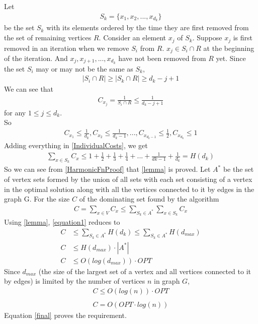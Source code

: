 \documentclass[paper=a4, fontsize=11pt]{scrartcl} %
\numberwithin{figure}{section} %
\numberwithin{table}{section} %
\begin{document}
\begin{enumerate}
Let 
\begin{align*} 
S_k = \{x_1, x_2, ..., x_{d_k}\} 
\end{align*}
be the set $S_k$ with its elements ordered by the time they are first removed from the set of remaining vertices $R$. Consider an element $x_j$ of $S_k$. Suppose  $x_j$ is first removed in an iteration when we remove $S_i$ from $R$. $x_j \in S_i \cap R$ at the beginning of the iteration. And $x_j, x_{j+1}, ..., x_{d_k}$ have not been removed from $R$ yet. Since the set $S_i$ may or may not be the same as $S_k$, 
\begin{align*} 
\left | S_i \cap R \right | \geq \left | S_k \cap R \right | \geq d_k - j + 1
\end{align*}
We can see that
\begin{align*} 
C_{x_j} = \frac{1}{S_i \cap R} \leq \frac{1}{d_k - j + 1} 
\end{align*} for any $1 \leq j \leq d_k$.\\
So
\begin{align} \label{IndividualCosts}
C_{x_1} \leq \frac{1}{d_k}, C_{x_2} \leq \frac{1}{d_k -1},..., C_{x_{d_k -1}} \leq \frac{1}{2}, C_{x_{d_k}} \leq 1
\end{align}
Adding everything in \ref{IndividualCosts}, we get
\begin{align} \label{HarmonicFnProof}
\sum \limits_{x \in S_k} C_x \leq 1 + \frac{1}{2} + \frac{1}{3}+ \frac{1}{4} + ... + \frac{1}{d{k-1}} + \frac{1}{d_k} = H(d_k)
\end{align}
So we can see from \ref{HarmonicFnProof} that \ref{lemma} is proved. Let $A^*$ be the set of vertex sets formed by the union of all sets with each set consisting of a vertex in the optimal solution along with all the vertices connected to it by edges in the graph G. For the size $C$ of the dominating set found by the algorithm
\begin{align} \label{equation1}
C= \sum \limits_{x \in V} C_x \leq \sum \limits_{S_k \in A^*} \sum \limits_{x \in S_k} C_x
\end{align}
Using \ref{lemma}, \ref{equation1} reduces to
\begin{align*} 
C &\leq \sum \limits_{S_k \in A^*} H(d_k) \leq \sum \limits_{S_k \in A^*} H(d_{max})\\
C &\leq H(d_{max}) \cdot \left | A^* \right |\\
C &\leq O(log(d_{max})) \cdot OPT
\end{align*} 
Since $d_{max}$ (the size of the largest set of a vertex and all vertices connected to it by edges) is limited by the number of vertices $n$ in graph $G$,
\begin{align*} 
C \leq O(log(n)) \cdot OPT\\
\end{align*} 
\begin{align} \label{final}
C = O(OPT \cdot log(n))
\end{align}
Equation \ref{final} proves the requirement.


\end{enumerate}
\end{document}
